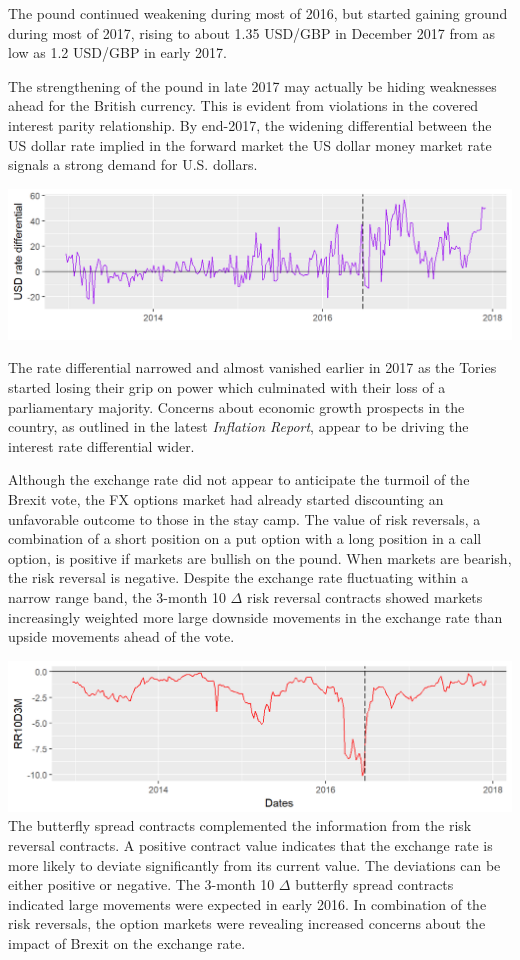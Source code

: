 \documentclass[]{book}
\theoremstyle{definition}
\theoremstyle{definition}
\theoremstyle{definition}
\theoremstyle{remark}
\begin{document}
The pound continued weakening during most of 2016, but started gaining
ground during most of 2017, rising to about 1.35 USD/GBP in December
2017 from as low as 1.2 USD/GBP in early 2017.

The strengthening of the pound in late 2017 may actually be hiding
weaknesses ahead for the British currency. This is evident from
violations in the covered interest parity relationship. By end-2017, the
widening differential between the US dollar rate implied in the forward
market the US dollar money market rate signals a strong demand for U.S.
dollars.

\includegraphics[width=1\linewidth]{images/unnamed-chunk-70-1}

The rate differential narrowed and almost vanished earlier in 2017 as
the Tories started losing their grip on power which culminated with
their loss of a parliamentary majority. Concerns about economic growth
prospects in the country, as outlined in the latest \emph{Inflation
Report}, appear to be driving the interest rate differential wider.

Although the exchange rate did not appear to anticipate the turmoil of
the Brexit vote, the FX options market had already started discounting
an unfavorable outcome to those in the stay camp. The value of risk
reversals, a combination of a short position on a put option with a long
position in a call option, is positive if markets are bullish on the
pound. When markets are bearish, the risk reversal is negative. Despite
the exchange rate fluctuating within a narrow range band, the 3-month 10
\(\Delta\) risk reversal contracts showed markets increasingly weighted
more large downside movements in the exchange rate than upside movements
ahead of the vote.

\includegraphics[width=1\linewidth]{images/unnamed-chunk-71-1} The
butterfly spread contracts complemented the information from the risk
reversal contracts. A positive contract value indicates that the
exchange rate is more likely to deviate significantly from its current
value. The deviations can be either positive or negative. The 3-month 10
\(\Delta\) butterfly spread contracts indicated large movements were
expected in early 2016. In combination of the risk reversals, the option
markets were revealing increased concerns about the impact of Brexit on
the exchange rate.
\end{document}
